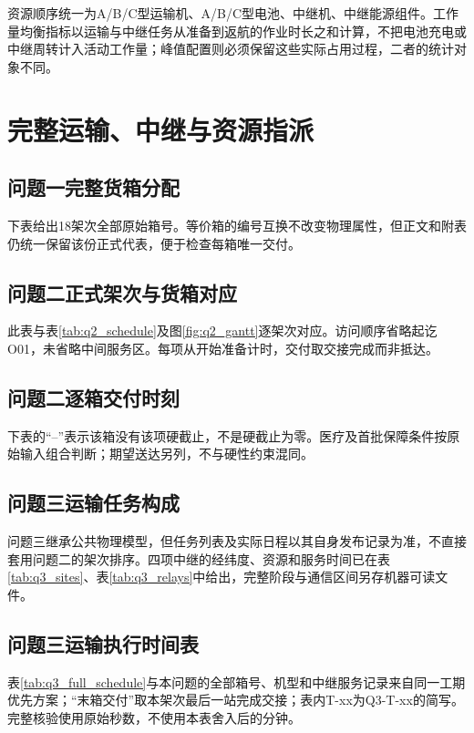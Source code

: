 资源顺序统一为A/B/C型运输机、A/B/C型电池、中继机、中继能源组件。工作量均衡指标以运输与中继任务从准备到返航的作业时长之和计算，不把电池充电或中继周转计入活动工作量；峰值配置则必须保留这些实际占用过程，二者的统计对象不同。

\section{完整运输、中继与资源指派}
\label{app:full_schedules}
\subsection{问题一完整货箱分配}
下表给出18架次全部原始箱号。等价箱的编号互换不改变物理属性，但正文和附表仍统一保留该份正式代表，便于检查每箱唯一交付。


\subsection{问题二正式架次与货箱对应}
此表与表\ref{tab:q2_schedule}及图\ref{fig:q2_gantt}逐架次对应。访问顺序省略起讫O01，未省略中间服务区。每项从开始准备计时，交付取交接完成而非抵达。


\subsection{问题二逐箱交付时刻}
下表的“--”表示该箱没有该项硬截止，不是硬截止为零。医疗及首批保障条件按原始输入组合判断；期望送达另列，不与硬性约束混同。


\subsection{问题三运输任务构成}
问题三继承公共物理模型，但任务列表及实际日程以其自身发布记录为准，不直接套用问题二的架次排序。四项中继的经纬度、资源和服务时间已在表\ref{tab:q3_sites}、表\ref{tab:q3_relays}中给出，完整阶段与通信区间另存机器可读文件。


\subsection{问题三运输执行时间表}
表\ref{tab:q3_full_schedule}与本问题的全部箱号、机型和中继服务记录来自同一工期优先方案；“末箱交付”取本架次最后一站完成交接；表内T-xx为Q3-T-xx的简写。完整核验使用原始秒数，不使用本表舍入后的分钟。


